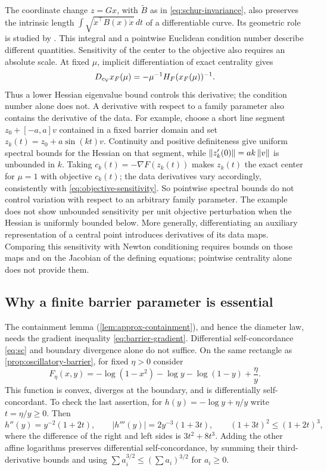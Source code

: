 The coordinate change $z=Gx$, with $\widetilde B$ as in
\eqref{eq:schur-invariance}, also preserves the intrinsic length
$\int\sqrt{\dot x^\top B(x)\dot x}\,dt$ of a differentiable curve.
Its geometric role is studied by \citet{nesterovtodd2002}. This
integral and a pointwise Euclidean condition number describe different
quantities. Sensitivity of the center to the objective also requires an
absolute scale. At fixed $\mu$, implicit differentiation of exact centrality gives
\begin{equation}
 D_{c_{\mathcal V}}x_F(\mu)=-\mu^{-1}H_F(x_F(\mu))^{-1}.
 \label{eq:objective-sensitivity}
\end{equation}
Thus a lower Hessian eigenvalue bound controls this derivative; the
condition number alone does not. A derivative with respect to a family
parameter also contains the derivative of the data. For example, choose a short line segment
$z_0+[-a,a]v$ contained in a fixed barrier domain and set
$z_k(t)=z_0+a\sin(kt)v$. Continuity and positive definiteness give
uniform spectral bounds for the Hessian on that segment, while
$\left\lVert z_k'(0)\right\rVert=ak\left\lVert v\right\rVert$ is unbounded in $k$. Taking
$c_k(t)=-\nabla F(z_k(t))$ makes $z_k(t)$ the exact center
for $\mu=1$ with objective $c_k(t)$; the data derivatives vary
accordingly, consistently with \eqref{eq:objective-sensitivity}. So
pointwise spectral bounds do not control variation with respect to an
arbitrary family parameter. The example does not show unbounded
sensitivity per unit objective perturbation when the Hessian is
uniformly bounded below. More generally, differentiating an auxiliary
representation of a central point introduces derivatives of its data
maps. Comparing this sensitivity with Newton conditioning requires
bounds on those maps and on the Jacobian of the defining equations;
pointwise centrality alone does not provide them.

\subsection{Why a finite barrier parameter is essential}

The containment lemma (\cref{lem:approx-containment}), and hence the
diameter law, needs the gradient inequality
\eqref{eq:barrier-gradient}. Differential self-concordance
\eqref{eq:sc} and boundary divergence alone do not suffice.
On the same rectangle as \cref{prop:oscillatory-barrier}, for fixed
$\eta>0$ consider
\begin{equation}
 F_\eta(x,y)=-\log(1-x^2)-\log y-\log(1-y)+\frac{\eta}{y}.
 \label{eq:infinite-parameter-example}
\end{equation}
This function is convex, diverges at the boundary, and is
differentially self-concordant. To check the last assertion, for
$h(y)=-\log y+\eta/y$ write $t=\eta/y\geq0$. Then
\[
 h''(y)=y^{-2}(1+2t),\qquad
 |h'''(y)|=2y^{-3}(1+3t),\qquad
 (1+3t)^2\leq(1+2t)^3,
\]
where the difference of the right and left sides is $3t^2+8t^3$.
Adding the other affine logarithms preserves differential
self-concordance, by summing their third-derivative bounds and using
$\sum a_i^{3/2}\leq(\sum a_i)^{3/2}$ for $a_i\geq0$.


